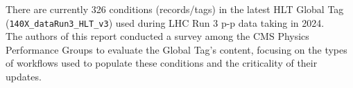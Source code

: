 There are currently 326 conditions (records/tags) in the latest HLT Global Tag (\texttt{140X\_dataRun3\_HLT\_v3}) used during LHC Run 3 p-p data taking in 2024.\\

The authors of this report conducted a survey among the CMS Physics Performance Groups to evaluate the Global Tag's content, focusing on the types of workflows used to populate these conditions and the criticality of their updates.


